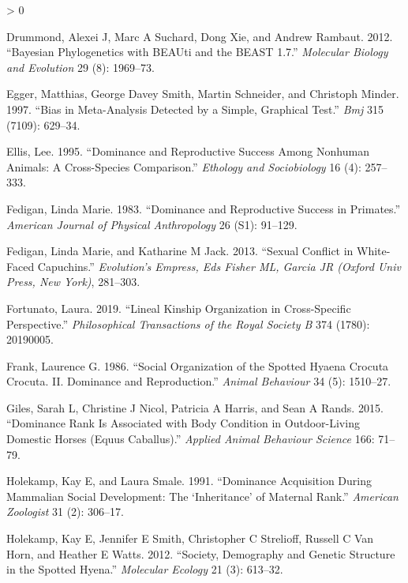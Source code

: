 \documentclass[
]{article}
\newlength{\cslhangindent}
\newenvironment{CSLReferences}[2] %
 {%
  \setlength{\parindent}{0pt}
  \ifodd #1 \everypar{\setlength{\hangindent}{\cslhangindent}}\ignorespaces\fi
  \ifnum #2 > 0
  \setlength{\parskip}{#2\baselineskip}
  \fi
 }%
 {}
\begin{document}
\begin{CSLReferences}{1}{0}
\leavevmode\hypertarget{ref-drummond2012bayesian}{}%
Drummond, Alexei J, Marc A Suchard, Dong Xie, and Andrew Rambaut. 2012.
{``Bayesian Phylogenetics with BEAUti and the BEAST 1.7.''}
\emph{Molecular Biology and Evolution} 29 (8): 1969--73.

\leavevmode\hypertarget{ref-egger1997bias}{}%
Egger, Matthias, George Davey Smith, Martin Schneider, and Christoph
Minder. 1997. {``Bias in Meta-Analysis Detected by a Simple, Graphical
Test.''} \emph{Bmj} 315 (7109): 629--34.

\leavevmode\hypertarget{ref-ellis1995dominance}{}%
Ellis, Lee. 1995. {``Dominance and Reproductive Success Among Nonhuman
Animals: A Cross-Species Comparison.''} \emph{Ethology and Sociobiology}
16 (4): 257--333.

\leavevmode\hypertarget{ref-fedigan1983dominance}{}%
Fedigan, Linda Marie. 1983. {``Dominance and Reproductive Success in
Primates.''} \emph{American Journal of Physical Anthropology} 26 (S1):
91--129.

\leavevmode\hypertarget{ref-fedigan2013sexual}{}%
Fedigan, Linda Marie, and Katharine M Jack. 2013. {``Sexual Conflict in
White-Faced Capuchins.''} \emph{Evolution's Empress, Eds Fisher ML,
Garcia JR (Oxford Univ Press, New York)}, 281--303.

\leavevmode\hypertarget{ref-fortunato2019lineal}{}%
Fortunato, Laura. 2019. {``Lineal Kinship Organization in Cross-Specific
Perspective.''} \emph{Philosophical Transactions of the Royal Society B}
374 (1780): 20190005.

\leavevmode\hypertarget{ref-frank1986social}{}%
Frank, Laurence G. 1986. {``Social Organization of the Spotted Hyaena
Crocuta Crocuta. II. Dominance and Reproduction.''} \emph{Animal
Behaviour} 34 (5): 1510--27.

\leavevmode\hypertarget{ref-giles2015dominance}{}%
Giles, Sarah L, Christine J Nicol, Patricia A Harris, and Sean A Rands.
2015. {``Dominance Rank Is Associated with Body Condition in
Outdoor-Living Domestic Horses (Equus Caballus).''} \emph{Applied Animal
Behaviour Science} 166: 71--79.

\leavevmode\hypertarget{ref-holekamp1991dominance}{}%
Holekamp, Kay E, and Laura Smale. 1991. {``Dominance Acquisition During
Mammalian Social Development: The {`Inheritance'} of Maternal Rank.''}
\emph{American Zoologist} 31 (2): 306--17.

\leavevmode\hypertarget{ref-holekamp2012society}{}%
Holekamp, Kay E, Jennifer E Smith, Christopher C Strelioff, Russell C
Van Horn, and Heather E Watts. 2012. {``Society, Demography and Genetic
Structure in the Spotted Hyena.''} \emph{Molecular Ecology} 21 (3):
613--32.


\end{CSLReferences}
\end{document}
